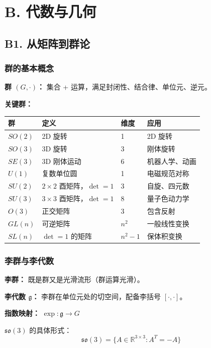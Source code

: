 \section{B. 代数与几何}

\subsection{B1. 从矩阵到群论}

\subsubsection{群的基本概念}

\textbf{群 $(G, \cdot)$：} 集合 + 运算，满足封闭性、结合律、单位元、逆元。

\textbf{关键群：}
\begin{center}
\begin{tabular}{llll}
\toprule
\textbf{群} & \textbf{定义} & \textbf{维度} & \textbf{应用} \\
\midrule
$SO(2)$ & 2D 旋转 & 1 & 2D 旋转 \\
$SO(3)$ & 3D 旋转 & 3 & 刚体旋转 \\
$SE(3)$ & 3D 刚体运动 & 6 & 机器人学、动画 \\
$U(1)$ & 复数单位圆 & 1 & 电磁规范对称 \\
$SU(2)$ & $2\times2$ 酉矩阵，$\det=1$ & 3 & 自旋、四元数 \\
$SU(3)$ & $3\times3$ 酉矩阵，$\det=1$ & 8 & 量子色动力学 \\
$O(3)$ & 正交矩阵 & 3 & 包含反射 \\
$GL(n)$ & 可逆矩阵 & $n^2$ & 一般线性变换 \\
$SL(n)$ & $\det=1$ 的矩阵 & $n^2-1$ & 保体积变换 \\
\bottomrule
\end{tabular}
\end{center}

\subsubsection{李群与李代数}
\label{subsec:lie-intro}

\textbf{李群：} 既是群又是光滑流形（群运算光滑）。

\textbf{李代数 $\mathfrak{g}$：} 李群在单位元处的切空间，配备李括号 $[\cdot, \cdot]$。

\textbf{指数映射：} $\exp: \mathfrak{g} \to G$

$\mathfrak{so}(3)$ 的具体形式：
\[
\mathfrak{so}(3) = \{A \in \mathbb{R}^{3\times 3} : A^T = -A\}
\]

